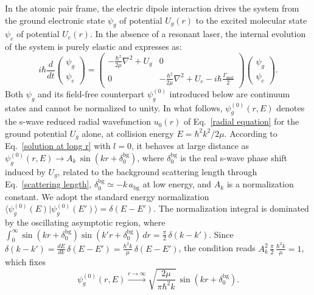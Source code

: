 In the atomic pair frame, the electric dipole interaction drives the system from the ground electronic state $\psi_g$ of potential $U_g(r)$ to the excited molecular state $\psi_e$ of potential $U_e(r)$. In the 
absence of a resonant laser, the internal evolution of the system is purely elastic and expresses as:
\begin{equation}
    i\hbar \frac{d}{dt}
    \begin{pmatrix}
        \psi_g\\
        \psi_e
    \end{pmatrix}
    =
    \begin{pmatrix}
        -\frac{\hbar^2}{2\mu}\nabla^2 + U_g & 0\\
        0 & -\frac{\hbar^2}{2\mu}\nabla^2 + U_e - i\hbar \frac{\Gamma_{\text{mol}}}{2}
    \end{pmatrix}
    \begin{pmatrix}
        \psi_g\\
        \psi_e
    \end{pmatrix}.
    \label{elastic evolution equation}
\end{equation}
Both $\psi_g$ and its field-free counterpart $\psi_g^{(0)}$ introduced below are
continuum states and cannot be normalized to unity. In what follows,
$\psi_g^{(0)}(r,E)$ denotes the s-wave reduced radial wavefunction
$u_0(r)$ of Eq.~\ref{radial equation} for the ground potential $U_g$ alone, at
collision energy $E=\hbar^2k^2/2\mu$. According to Eq.~\ref{solution at long r} with
$l=0$, it behaves at large distance as
$\psi_g^{(0)}(r,E)\to A_k\,\sin(kr+\delta_0^{\text{bg}})$, where
$\delta_0^{\text{bg}}$ is the real s-wave phase shift induced by $U_g$, related to the
background scattering length through Eq.~\ref{scattering length},
$\delta_0^{\text{bg}}\simeq -k\,a_{\text{bg}}$ at low energy, and $A_k$ is a
normalization constant. We adopt the standard energy normalization
\cite{bohn1997_prospects,jones_ultracold_2006}
$\langle\psi_g^{(0)}(E)\vert\psi_g^{(0)}(E')\rangle=\delta(E-E')$. The normalization
integral is dominated by the oscillating asymptotic region, where
$\int_0^\infty \sin(kr+\delta_0^{\text{bg}})\sin(k'r+\delta_0^{\text{bg}})\,dr
=\frac{\pi}{2}\,\delta(k-k')$. Since $\delta(k-k')=\frac{dE}{dk}\,\delta(E-E')
=\frac{\hbar^2k}{\mu}\,\delta(E-E')$, the condition reads
$A_k^2\,\frac{\pi}{2}\,\frac{\hbar^2 k}{\mu}=1$, which fixes
\begin{equation}
    \psi_g^{(0)}(r,E)\xrightarrow{r\to\infty}\sqrt{\frac{2\mu}{\pi\hbar^2 k}}\,
    \sin\!\left(kr+\delta_0^{\text{bg}}\right).
    \label{psi_g0 energy normalized}
\end{equation}
